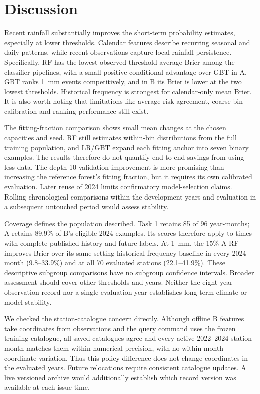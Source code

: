 \section{Discussion}

Recent rainfall substantially improves the short-term probability estimates, especially at lower thresholds. Calendar features describe recurring seasonal and daily patterns, while recent observations capture local rainfall persistence. Specifically, RF has the lowest observed threshold-average Brier among the classifier pipelines, with a small positive conditional advantage over GBT in A. GBT ranks 1~mm events competitively, and in B its Brier is lower at the two lowest thresholds. Historical frequency is strongest for calendar-only mean Brier. It is also worth noting that limitations like average risk agreement, coarse-bin calibration and ranking performance still exist.

The fitting-fraction comparison shows small mean changes at the chosen capacities and seed. RF still estimates within-bin distributions from the full training population, and LR/GBT expand each fitting anchor into seven binary examples. The results therefore do not quantify end-to-end savings from using less data. The depth-10 validation improvement is more promising than increasing the reference forest's fitting fraction, but it requires its own calibrated evaluation. Later reuse of 2024 limits confirmatory model-selection claims. Rolling chronological comparisons within the development years and evaluation in a subsequent untouched period would assess stability.

Coverage defines the population described. Task 1 retains 85 of 96 year-months; A retains 89.9\% of B's eligible 2024 examples. Its scores therefore apply to times with complete published history and future labels. At 1~mm, the 15\% A RF improves Brier over its same-setting historical-frequency baseline in every 2024 month (9.8--33.9\%) and at all 70 evaluated stations (22.1--41.9\%). These descriptive subgroup comparisons have no subgroup confidence intervals. Broader assessment should cover other thresholds and years. Neither the eight-year observation record nor a single evaluation year establishes long-term climate or model stability.

We checked the station-catalogue concern directly. Although offline B features take coordinates from observations and the query command uses the frozen training catalogue, all saved catalogues agree and every active 2022--2024 station-month matches them within numerical precision, with no within-month coordinate variation. Thus this policy difference does not change coordinates in the evaluated years. Future relocations require consistent catalogue updates. A live versioned archive would additionally establish which record version was available at each issue time.

